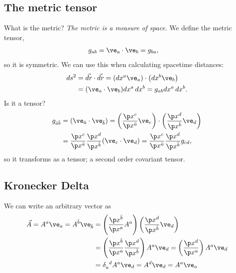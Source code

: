 \documentclass[a4paper, 11pt, normalem]{report}
\begin{document}
\section{The metric tensor}
What is the metric? \emph{The metric is a measure of space.}
We define the metric tensor,
\begin{align}
    g_{ab} &= \ve_a\cdot\ve_b = g_{ba},
\end{align}
so it is symmetric.
We can use this when calculating spacetime distances:
\begin{align}
    ds^2 &= \vec{dr}\cdot\vec{dr} = \left(dx^a\ve_a\right)\cdot\left(dx^b\ve_b\right) \\
         &= (\ve_a\cdot\ve_b)dx^a\,dx^b = g_{ab}dx^a\,dx^b.
\end{align}
Is it a tensor?
\begin{align}
    g_{\bar{a}\bar{b}} &= (\ve_{\bar{a}}\cdot\ve_{\bar{b}}) = \left(\frac{\p x^c}{\p x^{\bar{a}}}\ve_c\right)\cdot\left(\frac{\p x^{d}}{\p x^{\bar{b}}}\ve_d\right) \\
                       &= \frac{\p x^c}{\p x^{\bar{a}}}\frac{\p x^d}{\p x^{\bar{b}}}(\ve_c\cdot\ve_d) = \frac{\p x^c}{\p x^{\bar{a}}}\frac{\p x^d}{\p x^{\bar{b}}}g_{cd},
\end{align}
so it transforms as a tensor; a second order covariant tensor.

\section{Kronecker Delta}
We can write an arbitrary vector as
\begin{align}
    \vec{A} = A^a\ve_a = A^{\bar{b}}\ve_{\bar{b}} &= \left(\frac{\p x^{\bar{b}}}{\p x^a}A^a\right)\left(\frac{\p x^{d}}{\p x^{\bar{b}}}\ve_d\right) \\
                                                  &= \left(\frac{\p x^{\bar{b}}}{\p x^a}\frac{\p x^{d}}{\p x^{\bar{b}}}\right)A^a\ve_d = \left(\frac{\p x^{d}}{\p x^a}\right)A^a\ve_d \\
                                                  &= \tensor{\delta}{_a^d}A^a\ve_d = A^d\ve_d = A^a\ve_a
\end{align}

\chapter{}

\chapter{}
\end{document}
